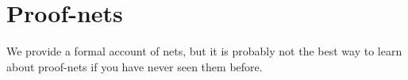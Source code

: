 \chapter{Proof-nets}\label{proof-nets}

We provide a formal account of nets, but it is probably not the best way to learn about proof-nets if you have never seen them before.


